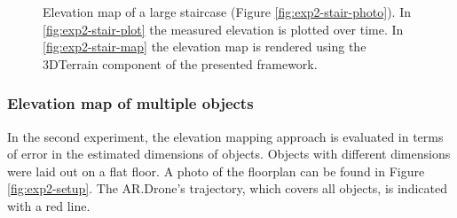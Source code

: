 \begin{figure}[htb!]
  \begin{center}

 \end{center}
  \caption{Elevation map of a large staircase (Figure \ref{fig:exp2-stair-photo}). In \ref{fig:exp2-stair-plot} the measured elevation is plotted over time. In \ref{fig:exp2-stair-map} the elevation map is rendered using the 3DTerrain component of the presented framework.}
  \label{fig:exp2-results}
\end{figure}

\subsubsection{Elevation map of multiple objects}

In the second experiment, the elevation mapping approach is evaluated in terms of error in the estimated dimensions of objects.
Objects with different dimensions were laid out on a flat floor.
A photo of the floorplan can be found in Figure \ref{fig:exp2-setup}.
The AR.Drone's trajectory, which covers all objects, is indicated with a red line.

